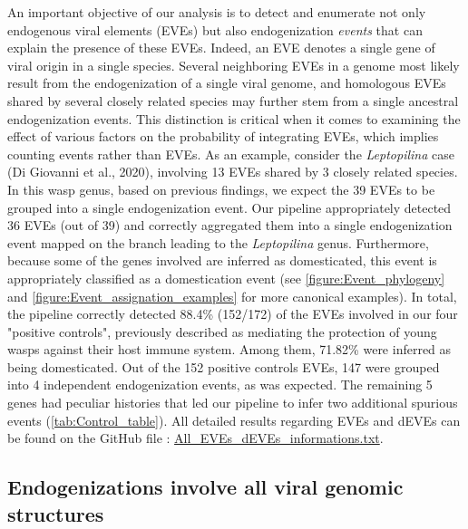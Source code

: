 An important objective of our analysis is to detect and enumerate not only endogenous viral elements (EVEs) but also endogenization \textit{events} that can explain the presence of these EVEs. Indeed, an EVE denotes a single gene of viral origin in a single species. Several neighboring EVEs in a genome most likely result from the endogenization of a single viral genome, and  homologous EVEs shared by several closely related species may further stem from a single ancestral endogenization events. This distinction is critical when it comes to examining the effect of various factors on the probability of integrating EVEs, which implies counting events rather than EVEs. As an example, consider the \textit{Leptopilina} case  (Di Giovanni et al., 2020), involving 13 EVEs shared by 3 closely related species. In this wasp genus, based on previous findings, we expect the 39 EVEs to be grouped into a single endogenization event. Our pipeline appropriately detected 36 EVEs (out of 39) and correctly aggregated them into a single endogenization event mapped on the branch leading to the \textit{Leptopilina} genus. Furthermore, because some of the genes involved are inferred as domesticated, this event is appropriately classified as a domestication event (see \figurename{ \ref{figure:Event_phylogeny}} and \figurename{ \ref{figure:Event_assignation_examples}} for more canonical examples).  
In total, the pipeline correctly detected 88.4\% (152/172) of the EVEs involved in our four "positive controls", previously described as mediating the protection of young wasps  against their host immune system. Among them, 71.82\% were inferred as being domesticated. Out of the 152 positive controls EVEs, 147  were grouped into 4 independent endogenization events, as was expected. The remaining 5 genes had peculiar histories that led our pipeline to infer two additional spurious events (\tablename{\ref{tab:Control_table}}). All detailed results regarding EVEs and dEVEs can be found on the GitHub file : \href{https://github.com/BenjaminGuinet/PhD_defense/blob/main/Supplementary_paper1/All_EVEs_dEVEs_informations.txt}{All\_EVEs\_dEVEs\_informations.txt}.

\subsection{Endogenizations involve all viral genomic structures}

